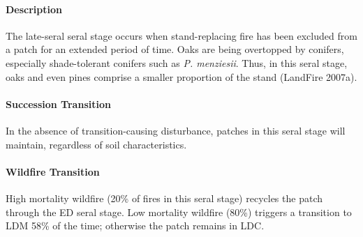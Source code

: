 \paragraph{Description} The late-seral seral stage occurs when stand-replacing fire has been excluded from a patch for an extended period of time. Oaks are being overtopped by conifers, especially shade-tolerant conifers such as \emph{P. menziesii}. Thus, in this seral stage, oaks and even pines comprise a smaller proportion of the stand (LandFire 2007a). 

\paragraph{Succession Transition} In the absence of transition-causing disturbance, patches in this seral stage will maintain, regardless of soil characteristics.

\paragraph{Wildfire Transition} High mortality wildfire (20\% of fires in this seral stage) recycles the patch through the ED seral stage. Low mortality wildfire (80\%) triggers a transition to LDM 58\% of the time; otherwise the patch remains in LDC.

\noindent\hrulefill




